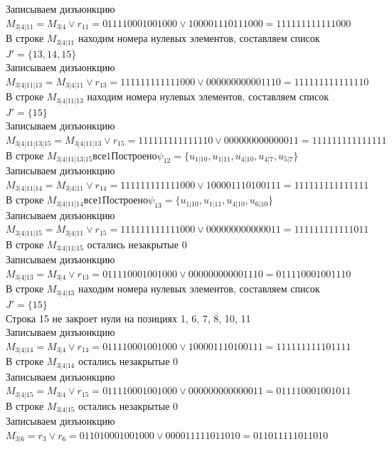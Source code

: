 \documentclass[12pt,a4paper]{report}
\begin{document}
Записываем дизъюнкцию $M_{3 | 4 | 11} = M_{3 | 4}\vee r_{11} = 011110001001000 \vee 100001110111000 = 111111111111000$ \\
В строке $M_{3 | 4 | 11}$ находим номера нулевых элементов, составляем список $J' = \{13, 14, 15\}$ \\
Записываем дизъюнкцию $M_{3 | 4 | 11 | 13} = M_{3 | 4 | 11}\vee r_{13} = 111111111111000 \vee 000000000001110 = 111111111111110$ \\
В строке $M_{3 | 4 | 11 | 13}$ находим номера нулевых элементов, составляем список $J' = \{15\}$ \\
Записываем дизъюнкцию $M_{3 | 4 | 11 | 13 | 15} = M_{3 | 4 | 11 | 13}\vee r_{15} = 111111111111110 \vee 000000000000011 = 111111111111111$ \\
В строке $M_{3 | 4 | 11 | 13 | 15} все 1 Построено \psi_{12} = \{u_{1 | 10},u_{1 | 11},u_{4 | 10},u_{4 | 7},u_{5 | 7}\}$ \\
Записываем дизъюнкцию $M_{3 | 4 | 11 | 14} = M_{3 | 4 | 11}\vee r_{14} = 111111111111000 \vee 100001110100111 = 111111111111111$ \\
В строке $M_{3 | 4 | 11 | 14} все 1 Построено \psi_{13} = \{u_{1 | 10},u_{1 | 11},u_{4 | 10},u_{6 | 10}\}$ \\
Записываем дизъюнкцию $M_{3 | 4 | 11 | 15} = M_{3 | 4 | 11}\vee r_{15} = 111111111111000 \vee 000000000000011 = 111111111111011$ \\
В строке $M_{3 | 4 | 11 | 15}$ остались незакрытые $0$ \\
Записываем дизъюнкцию $M_{3 | 4 | 13} = M_{3 | 4}\vee r_{13} = 011110001001000 \vee 000000000001110 = 011110001001110$ \\
В строке $M_{3 | 4 | 13}$ находим номера нулевых элементов, составляем список $J' = \{15\}$ \\
Строка 15 не закроет нули на позициях 1, 6, 7, 8, 10, 11 \\
Записываем дизъюнкцию $M_{3 | 4 | 14} = M_{3 | 4}\vee r_{14} = 011110001001000 \vee 100001110100111 = 111111111101111$ \\
В строке $M_{3 | 4 | 14}$ остались незакрытые $0$ \\
Записываем дизъюнкцию $M_{3 | 4 | 15} = M_{3 | 4}\vee r_{15} = 011110001001000 \vee 000000000000011 = 011110001001011$ \\
В строке $M_{3 | 4 | 15}$ остались незакрытые $0$ \\
Записываем дизъюнкцию $M_{3 | 6} = r_{3}\vee r_{6} = 011010001001000 \vee 000011111011010 = 011011111011010$ \\
\end{document}
